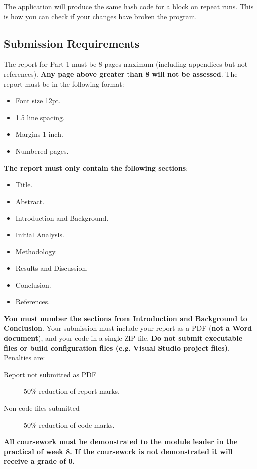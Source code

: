 \documentclass[a4paper, 12pt]{article}
\begin{document}
The application will produce the same hash code for a block on repeat runs.  This is how you can check if your changes have broken the program.

\subsection*{Submission Requirements}

The report for Part 1 must be 8 pages maximum (including appendices but not references).  {\bfseries Any page above greater than 8 will not be assessed}.  The report must be in the following format:

\begin{itemize}
	\item Font size 12pt.
	\item 1.5 line spacing.
	\item Margins 1 inch.
	\item Numbered pages.
\end{itemize}

{\bfseries The report must only contain the following sections}:
\begin{itemize}
	\item Title.
	\item Abstract.
	\item Introduction and Background.
	\item Initial Analysis.
	\item Methodology.
	\item Results and Discussion.
	\item Conclusion.
	\item References.
\end{itemize}

{\bfseries You must number the sections from Introduction and Background to Conclusion}. Your submission must include your report as a PDF ({\bfseries not a Word document}), and your code in a single ZIP file. {\bfseries Do not submit executable files or build configuration files (e.g. Visual Studio project files)}.  Penalties are:

\begin{description}
	\item[Report not submitted as PDF] 50\% reduction of report marks.
	\item[Non-code files submitted] 50\% reduction of code marks.
\end{description}

{\bfseries All coursework must be demonstrated to the module leader in the practical of week 8.  If the coursework is not demonstrated it will receive a grade of 0.}
\end{document}
